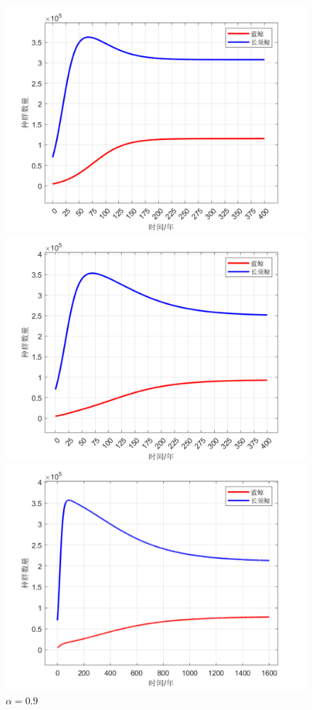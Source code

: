 \documentclass[UTF8]{ctexart}
\begin{document}
    \begin{figure}[H]
        \centering
        \includegraphics[scale=0.3]{a=0.3}
        \caption{$\alpha=0.3$}
        \includegraphics[scale=0.3]{a=0.6}
        \caption{$\alpha=0.6$}
        \includegraphics[scale=0.3]{a=0.9}
        \caption{$\alpha=0.9$}
    \end{figure}
    
\end{document}
